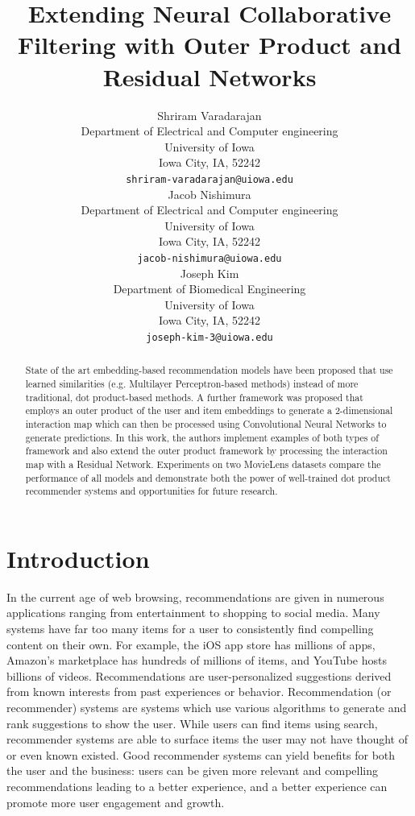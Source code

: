 \documentclass{article}
\title{Extending Neural Collaborative Filtering with Outer Product and Residual Networks}
\author{
Shriram Varadarajan \\
Department of Electrical and Computer engineering\\
University of Iowa\\
Iowa City, IA, 52242 \\
\texttt{shriram-varadarajan@uiowa.edu} \\
\And
Jacob Nishimura \\
Department of Electrical and Computer engineering\\
University of Iowa\\
Iowa City, IA, 52242 \\
\texttt{jacob-nishimura@uiowa.edu} \\
\And
Joseph Kim \\
Department of Biomedical Engineering\\
University of Iowa\\
Iowa City, IA, 52242 \\
\texttt{joseph-kim-3@uiowa.edu} \\
}
\begin{document}
\maketitle

\begin{abstract}
State of the art embedding-based recommendation models have been proposed that use learned similarities (e.g. Multilayer Perceptron-based methods) instead of more traditional, dot product-based methods. A further framework was proposed that employs an outer product of the user and item embeddings to generate a 2-dimensional interaction map which can then be processed using Convolutional Neural Networks to generate predictions. In this work, the authors implement examples of both types of framework and also extend the outer product framework by processing the interaction map with a Residual Network. Experiments on two MovieLens datasets compare the performance of all models and demonstrate both the power of well-trained dot product recommender systems and opportunities for future research.
\end{abstract}


\section{Introduction}
In the current age of web browsing, recommendations are given in numerous applications ranging from entertainment to shopping to social media. Many systems have far too many items for a user to consistently find compelling content on their own. For example, the iOS app store has millions of apps, Amazon's marketplace has hundreds of millions of items, and YouTube hosts billions of videos. Recommendations are user-personalized suggestions derived from known interests from past experiences or behavior. Recommendation (or recommender) systems are systems which use various algorithms to generate and rank suggestions to show the user. While users can find items using search, recommender systems are able to surface items the user may not have thought of or even known existed. Good recommender systems can yield benefits for both the user and the business: users can be given more relevant and compelling recommendations leading to a better experience, and a better experience can promote more user engagement and growth.
\end{document}

